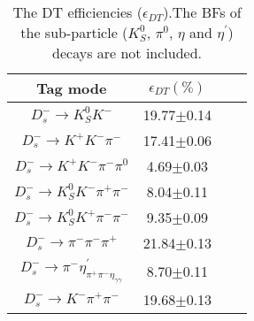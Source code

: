     \begin{table}[htbp]
        \caption{ The DT efficiencies ($\epsilon_{DT}$).The BFs of the sub-particle ($K_{S}^{0}$, $\pi^{0}$, $\eta$ and $\eta^{'}$) decays are not included.}
        \label{DT-eff}
        \begin{center}
            \begin{tabular}{cccc}
                \toprule\toprule
                Tag mode   & $\epsilon_{DT}(\%)$\\
                \hline
                $D_{s}^{-} \rightarrow K_{S}^{0}K^{-}$                                                   & 19.77$\pm$0.14\\
                $D_{s}^{-} \rightarrow K^{+}K^{-}\pi^{-}$                                                & 17.41$\pm$0.06\\
                $D_{s}^{-} \rightarrow K^{+}K^{-}\pi^{-}\pi^{0}$                                         &  4.69$\pm$0.03\\
                $D_{s}^{-} \rightarrow K_{S}^{0}K^{-}\pi^{+}\pi^{-}$                                     &  8.04$\pm$0.11\\
                $D_{s}^{-} \rightarrow K_{S}^{0}K^{+}\pi^{-}\pi^{-}$                                     &  9.35$\pm$0.09\\
                $D_{s}^{-} \rightarrow \pi^{-}\pi^{-}\pi^{+}$                                            & 21.84$\pm$0.13\\
                $D_{s}^{-} \rightarrow \pi^{-}\eta_{\pi^{+}\pi^{-}\eta_{\gamma\gamma}}^{'}$               &  8.70$\pm$0.11\\
                $D_{s}^{-} \rightarrow K^{-}\pi^{+}\pi^{-}$                                              & 19.68$\pm$0.13\\
                \bottomrule\bottomrule
            \end{tabular}
        \end{center}
    \end{table}

